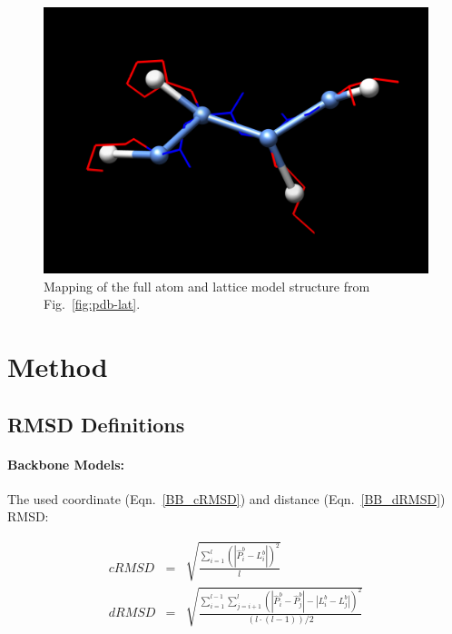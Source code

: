\documentclass{article}
\begin{document}
\vspace{1em}
\begin{figure}[H]
\begin{center}
	\begin{minipage}{0.4\textwidth}
		\includegraphics[width=\textwidth]{fit_both}
	\end{minipage}
\end{center}
\caption{Mapping of the full atom and lattice model structure from Fig.~\ref{fig:pdb-lat}.}
\label{fig:fit}
\end{figure}

\section{Method}
\label{sec:method}

\subsection{RMSD Definitions}
\label{sec:RMSD}

\paragraph{Backbone Models:}

The used coordinate (Eqn.~\ref{BB_cRMSD}) and distance (Eqn.~\ref{BB_dRMSD})
RMSD:

{
\begin{eqnarray}
	cRMSD & = &
	\sqrt{\frac{\sum^{l}_{i=1}
		(|\hat{P}^b_i-L^b_i|)^2}{l}} \label{BB_cRMSD}
	\\
	dRMSD & = &
	\sqrt{\frac{\sum^{ l-1}_{i=1}\sum^{l}_{j=i+1}
		(|\hat{P}^b_i-\hat{P}^b_j|-|L^b_i-L^b_j|)^2 
	}{(l \cdot (l-1))/2}} \label{BB_dRMSD} 
\end{eqnarray}
}
\end{document}
